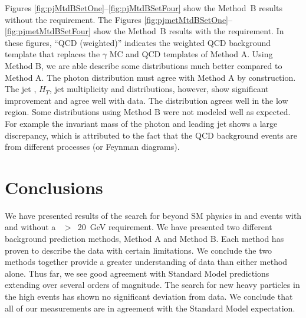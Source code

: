 \documentclass[12pt,twoside,letterpaper,doublespace]{article}
\begin{document}




Figures \ref{fig:pjMtdBSetOne}--\ref{fig:pjMtdBSetFour} show the Method~B results without the \met requirement. The Figures \ref{fig:pjmetMtdBSetOne}--\ref{fig:pjmetMtdBSetFour} show the Method~B results with the \met requirement.  In these figures, ``QCD (weighted)'' indicates the weighted QCD background template that replaces the $\gamma$ MC and QCD templates of Method A.  Using Method B, we are able describe some distributions much better compared to Method A. The photon \et distribution must agree with Method A by construction. The jet \et, $H_{T}$, jet multiplicity and \met distributions, however, show significant improvement and agree well with data. The \met distribution agrees well in the low \met region. Some distributions using Method B were not modeled well as expected. For example the invariant mass of the photon and leading jet shows a large discrepancy, which is attributed to the fact that the QCD background events are from different processes (or Feynman diagrams).

\section{Conclusions}
We have presented results of the search for beyond SM physics in \phoonejet and \photwojet events with and without a \met~$>$~20~GeV requirement. We have presented two different background prediction methods, Method A and Method B. Each method has proven to describe the \phojets data with certain limitations. We conclude the two methods together provide a greater understanding of data than either method alone. Thus far, we see good agreement with Standard Model predictions extending over several orders of magnitude. The search for new heavy particles in the high \met events has shown no significant deviation from data. We conclude that all of our measurements are in agreement with the Standard Model expectation.
\end{document}
